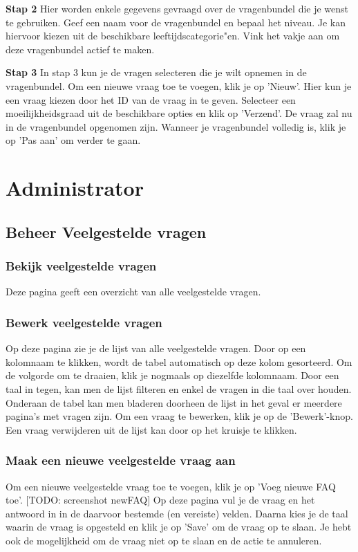 \documentclass[]{article}
\begin{document}
\textbf{Stap 2}
Hier worden enkele gegevens gevraagd over de vragenbundel die je wenst te gebruiken. 
Geef een naam voor de vragenbundel en bepaal het niveau. Je kan hiervoor kiezen uit de beschikbare leeftijdscategorie"en. Vink het vakje aan om deze vragenbundel actief te maken.

\textbf{Stap 3}
In stap 3 kun je de vragen selecteren die je wilt opnemen in de vragenbundel. Om een nieuwe vraag toe te voegen, klik je op 'Nieuw'. Hier kun je een vraag kiezen door het ID van de vraag in te geven. Selecteer een moeilijkheidsgraad uit de beschikbare opties en klik op 'Verzend'. De vraag zal nu in de vragenbundel opgenomen zijn. Wanneer je vragenbundel volledig is, klik je op 'Pas aan' om verder te gaan.

\section{Administrator}

\subsection{Beheer Veelgestelde vragen}

\subsubsection{Bekijk veelgestelde vragen}
Deze pagina geeft een overzicht van alle veelgestelde vragen.

\subsubsection{Bewerk veelgestelde vragen}
Op deze pagina zie je de lijst van alle veelgestelde vragen. Door op een kolomnaam te klikken, wordt de tabel automatisch op deze kolom gesorteerd. Om de volgorde om te draaien, klik je nogmaals op diezelfde kolomnaam. Door een taal in tegen, kan men de lijst filteren en enkel de vragen in die taal over houden. Onderaan de tabel kan men bladeren doorheen de lijst in het geval er meerdere pagina's met vragen zijn. Om een vraag te bewerken, klik je op de 'Bewerk'-knop. Een vraag verwijderen uit de lijst kan door op het kruisje te klikken.

\subsubsection{Maak een nieuwe veelgestelde vraag aan}
Om een nieuwe veelgestelde vraag toe te voegen, klik je op 'Voeg nieuwe FAQ toe'. [TODO: screenshot newFAQ] Op deze pagina vul je de vraag en het antwoord in in de daarvoor bestemde (en vereiste) velden. Daarna kies je de taal waarin de vraag is opgesteld en klik je op 'Save' om de vraag op te slaan. Je hebt ook de mogelijkheid om de vraag niet op te slaan en de actie te annuleren.
\end{document}
